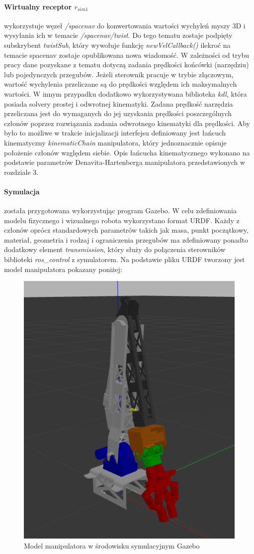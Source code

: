 \documentclass[a4paper, 12pt, twoside]{article}
\begin{document}
\paragraph{Wirtualny receptor $r_{sim1}$} wykorzystuje węzeł \textit{/spacenav} do konwertowania wartości wychyleń myszy 3D i wysyłania ich w temacie \textit{/spacenav/twist}. Do tego tematu zostaje podpięty subskrybent \textit{twistSub}, który wywołuje funkcję \textit{newVelCallback()} ilekroć na temacie spacenav zostaje opublikowana nowa wiadomość. W zależności od trybu pracy dane pozyskane z tematu dotyczą zadania prędkości końcówki (narzędziu) lub pojedynczych przegubów. Jeżeli sterownik pracuje w trybie złączowym, wartość wychylenia przeliczane są do prędkości względem ich maksymalnych wartości. W innym przypadku dodatkowo wykorzystywana biblioteka \textit{kdl}, która posiada solvery prostej i odwrotnej kinematyki. Zadana prędkość narzędzia przeliczana jest do wymaganych do jej uzyskania prędkości poszczególnych członów poprzez rozwiązania zadania odwrotnego kinematyki dla prędkości. Aby było to możliwe w trakcie inicjalizacji interfejsu definiowany jest łańcuch kinematyczny \textit{kinematicChain} manipulatora, który jednoznacznie opisuje położenie członów względem siebie. Opis łańcucha kinematycznego wykonano na podstawie parametrów Denavita-Hartenberga manipulatora przedstawionych w rozdziale 3.

\paragraph{Symulacja} została przygotowana wykorzystując program Gazebo. W celu zdefiniowania modelu fizycznego i wizualnego robota wykorzystano format URDF. Każdy z członów oprócz standardowych parametrów takich jak masa, punkt początkowy, materiał, geometria i rodzaj i ograniczenia przegubów ma zdefiniowany ponadto dodatkowy element \textit{transmission}, który służy do połączenia sterowników biblioteki \textit{ros\_control} z symulatorem. Na podstawie pliku URDF tworzony jest model manipulatora pokazany poniżej:

\begin{figure}[hbt!]
\centering
\includegraphics[width=0.6\linewidth]{images/simulation.png}
\caption{Model manipulatora w środowisku symulacyjnym Gazebo}
\label{fig:simulation}
\end{figure}
\end{document}
